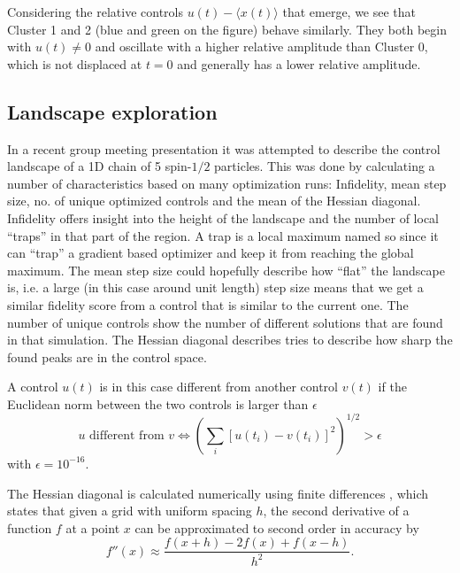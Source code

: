 \documentclass[a4paper, twocolumn]{revtex4-1}
\begin{document}
Considering the relative controls $u(t) - \langle x(t) \rangle$ that emerge, we see that Cluster 1 and 2 (blue and green on the figure) behave similarly. They both begin with $u(t)\neq 0$ and oscillate with a higher relative amplitude than Cluster 0, which is not displaced at $t=0$ and generally has a lower relative amplitude. 

\subsection{Landscape exploration} \label{subsec:qengine-landscape-expl}
In a recent group meeting presentation \cite{MogensQMMG} it was attempted to describe the control landscape of a 1D chain of 5 spin-$1/2$ particles. This was done by calculating a number of characteristics based on many optimization runs: Infidelity, mean step size, no. of unique optimized controls and the mean of the Hessian diagonal. Infidelity offers insight into the height of the landscape and the number of local ``traps'' in that part of the region. A trap is a local maximum named so since it can ``trap'' a gradient based optimizer and keep it from reaching the global maximum. The mean step size could hopefully describe how ``flat'' the landscape is, i.e. a large (in this case around unit length) step size means that we get a similar fidelity score from a control that is similar to the current one. The number of unique controls show the number of different solutions that are found in that simulation. The Hessian diagonal describes tries to describe how sharp the found peaks are in the control space.


A control $u(t)$ is in this case different from another control $v(t)$ if the Euclidean norm between the two controls is larger than $\epsilon$
\begin{equation}
	u \text{ different from } v \Leftrightarrow \left(\sum\limits_{i} [ u(t_i) - v(t_i) ]^2 \right)^{1/2} > \epsilon
\end{equation}
with $\epsilon = 10^{-16}$.

The Hessian diagonal is calculated numerically using finite differences \cite{fornberg1988generation}, which states that given a grid with uniform spacing $h$, the second derivative of a function $f$ at a point $x$ can be approximated to second order in accuracy by 
\begin{equation}
	f''(x) \approx \frac{f(x+h) - 2f(x) + f(x-h)}{h^2}.
	\label{eq:qengine-landscape-finite-differences}
\end{equation}
\end{document}
